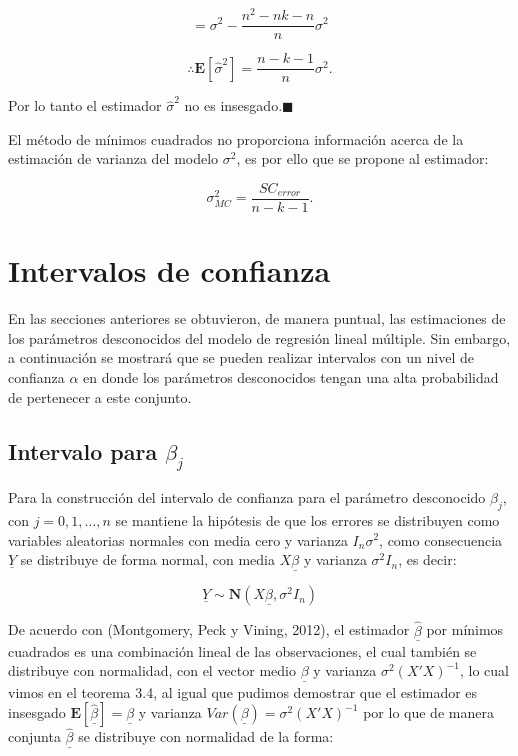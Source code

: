 \documentclass[
  a4paper,
  oneside,
  openany]{book}
\begin{document}
\[=\sigma^2-\frac{n^2-nk-n}{n}\sigma^2\]

\[\therefore \mathbf{E}[\hat{\sigma}^2]=\frac{n-k-1}{n}\sigma^2. \]

Por lo tanto el estimador \(\hat{\sigma}^2\) no es insesgado.\(\blacksquare\)

El método de mínimos cuadrados no proporciona información acerca de la estimación de varianza del modelo \(\sigma^2\), es por ello que se propone al estimador:

\[\sigma^2_{MC}=\frac{SC_{error}}{n-k-1}.\]

\hypertarget{intervalos-de-confianza-2}{%
\chapter{Intervalos de confianza}\label{intervalos-de-confianza-2}}

En las secciones anteriores se obtuvieron, de manera puntual, las estimaciones de los parámetros desconocidos del modelo de regresión lineal múltiple. Sin embargo, a continuación se mostrará que se pueden realizar intervalos con un nivel de confianza \(\alpha\) en donde los parámetros desconocidos tengan una alta probabilidad de pertenecer a este conjunto.

\hypertarget{intervalo-para-beta_j}{%
\section{\texorpdfstring{Intervalo para \(\beta_{j}\)}{Intervalo para \textbackslash beta\_\{j\}}}\label{intervalo-para-beta_j}}

Para la construcción del intervalo de confianza para el parámetro desconocido \(\beta_{j}\), con \(j=0,1,\ldots,n\) se mantiene la hipótesis de que los errores se distribuyen como variables aleatorias normales con media cero y varianza \(I_{n}\sigma^2\), como consecuencia \(\underline{Y}\) se distribuye de forma normal, con media \(X\underline{\beta}\) y varianza \(\sigma^2 I_{n}\), es decir:

\[\underline{Y} \sim \mathbf{N}(X\underline{\beta},\sigma^2 I_{n})\]

De acuerdo con (Montgomery, Peck y Vining, 2012), el estimador \(\underline{\hat{\beta}}\) por mínimos cuadrados es una combinación lineal de las observaciones, el cual también se distribuye con normalidad, con el vector medio \(\underline{\beta}\) y varianza \(\sigma^2(X'X)^{-1}\), lo cual vimos en el teorema 3.4, al igual que pudimos demostrar que el estimador es insesgado \(\mathbf{E}[\underline{\hat{\beta}}]=\underline{\beta}\) y varianza \(Var(\underline{\beta})=\sigma^2(X'X)^{-1}\) por lo que de manera conjunta \(\underline{\hat{\beta}}\) se distribuye con normalidad de la forma:
\end{document}
